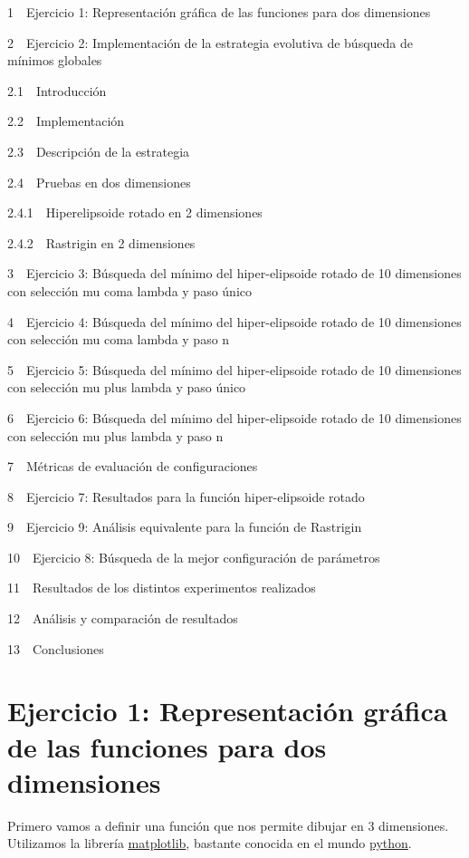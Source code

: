 \documentclass[11pt]{article}
\begin{document}
{1~~}Ejercicio 1: Representación gráfica de las funciones para dos
dimensiones

{2~~}Ejercicio 2: Implementación de la estrategia evolutiva de búsqueda
de mínimos globales

{2.1~~}Introducción

{2.2~~}Implementación

{2.3~~}Descripción de la estrategia

{2.4~~}Pruebas en dos dimensiones

{2.4.1~~}Hiperelipsoide rotado en 2 dimensiones

{2.4.2~~}Rastrigin en 2 dimensiones

{3~~}Ejercicio 3: Búsqueda del mínimo del hiper-elipsoide rotado de 10
dimensiones con selección mu coma lambda y paso único

{4~~}Ejercicio 4: Búsqueda del mínimo del hiper-elipsoide rotado de 10
dimensiones con selección mu coma lambda y paso n

{5~~}Ejercicio 5: Búsqueda del mínimo del hiper-elipsoide rotado de 10
dimensiones con selección mu plus lambda y paso único

{6~~}Ejercicio 6: Búsqueda del mínimo del hiper-elipsoide rotado de 10
dimensiones con selección mu plus lambda y paso n

{7~~}Métricas de evaluación de configuraciones

{8~~}Ejercicio 7: Resultados para la función hiper-elipsoide rotado

{9~~}Ejercicio 9: Análisis equivalente para la función de Rastrigin

{10~~}Ejercicio 8: Búsqueda de la mejor configuración de parámetros

{11~~}Resultados de los distintos experimentos realizados

{12~~}Análisis y comparación de resultados

{13~~}Conclusiones

    \section{Ejercicio 1: Representación gráfica de las funciones para dos
dimensiones}\label{ejercicio-1-representaciuxf3n-gruxe1fica-de-las-funciones-para-dos-dimensiones}

Primero vamos a definir una función que nos permite dibujar en 3
dimensiones. Utilizamos la librería
\href{http://matplotlib.org/}{matplotlib}, bastante conocida en el mundo
\href{https://www.python.org/}{python}.
\end{document}

